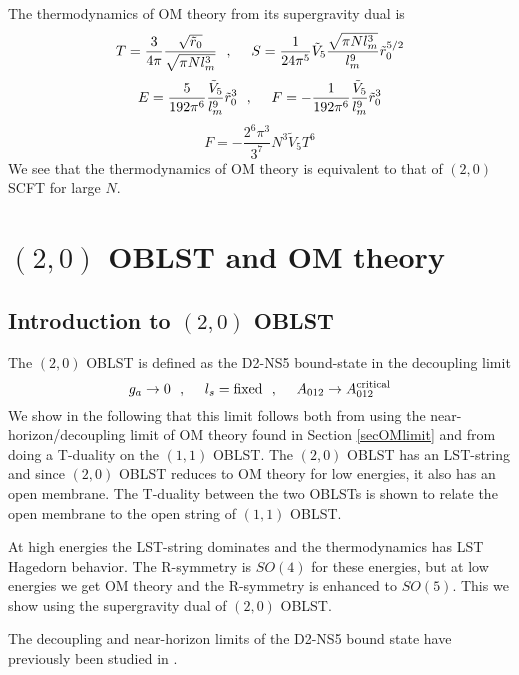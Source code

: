\documentclass[a4paper,twoside,titlepage,12pt]{article}
\begin{document}
The thermodynamics of OM theory from its supergravity dual is
%
\begin{equation}
T = \frac{3}{4\pi}\frac{\sqrt{\tilde{r}_0}}{\sqrt{\pi N l_m^3}}
\ \ ,\ \ \ \ 
S = \frac{1}{24 \pi^5} \tilde{V}_5 
\frac{\sqrt{\pi N l_m^3}}{l_m^9 }
\tilde{r}_0^{5/2} 
\end{equation}
\begin{equation}
E = \frac{5}{192 \pi^6} \frac{\tilde{V}_5}{l_m^9} \tilde{r}_0^3
\ \ ,\ \ \ \ 
F = - \frac{1}{192 \pi^6} \frac{\tilde{V}_5}{l_m^9} \tilde{r}_0^3
\end{equation}
\begin{equation}
F = - \frac{2^6 \pi^3}{3^7} N^3 \tilde{V}_5 T^6
\end{equation}
%
We see that the thermodynamics of OM theory is equivalent to that
of $(2,0)$ SCFT for large $N$.



\section{$(2,0)$ OBLST and OM theory}
\label{secOBLST20}
\subsection{Introduction to $(2,0)$ OBLST}

The $(2,0)$ OBLST is defined as the D2-NS5 bound-state 
in the decoupling limit
%
\begin{equation}
g_a \rightarrow 0 \ \ ,\ \ \ \  l_s = \mbox{fixed} \ \ ,\ \ \ \  
A_{012} \rightarrow A^{\rm critical}_{012} 
\end{equation}
%
We show in the following that this limit follows both from
using the near-horizon/decoupling limit of OM theory found
in Section \ref{secOMlimit} and 
from doing a T-duality on the $(1,1)$ OBLST.
The $(2,0)$ OBLST has an LST-string and since 
$(2,0)$ OBLST reduces to OM theory for low energies, it also has
an open membrane.
The T-duality between the two OBLSTs 
is shown to relate the open membrane to the
open string of $(1,1)$ OBLST.

At high energies the LST-string dominates and the thermodynamics
has LST Hagedorn behavior. The R-symmetry is $SO(4)$ for these energies,
but at low energies we get OM theory and the R-symmetry is enhanced
to $SO(5)$. This we show using the supergravity dual of $(2,0)$ OBLST.


The decoupling and near-horizon limits of the D2-NS5 bound state
have previously been studied in \cite{Alishahiha:1999ci,Alishahiha:2000er}.
\end{document}
